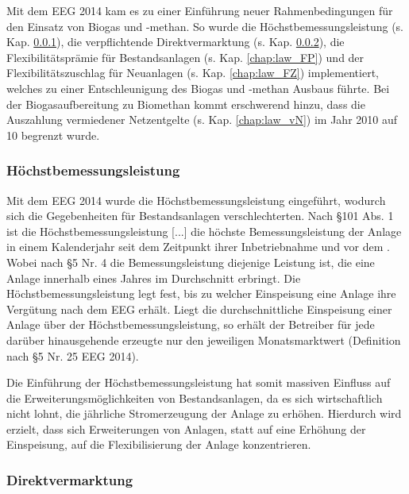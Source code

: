 Mit dem \gls{EEG} \SI{2014}{\relax} kam es zu einer Einführung neuer Rahmenbedingungen für den Einsatz von Biogas und -methan. So wurde die Höchstbemessungsleistung (s. Kap. \ref{chap:law_Bem}), die verpflichtende Direktvermarktung (s. Kap. \ref{chap:law_DV}), die Flexibilitätsprämie für Bestandsanlagen (s. Kap. \ref{chap:law_FP}) und der Flexibilitätszuschlag für Neuanlagen (s. Kap. \ref{chap:law_FZ}) implementiert, welches zu einer Entschleunigung des Biogas und -methan Ausbaus führte. Bei der Biogasaufbereitung zu Biomethan kommt erschwerend hinzu, dass die Auszahlung vermiedener Netzentgelte (s. Kap. \ref{chap:law_vN}) im Jahr \SI{2010}{\relax} auf \SI{10}{\Jahre} begrenzt wurde. \parencite{BDEW2019a}


\subsubsection{Höchstbemessungsleistung}\label{chap:law_Bem}

Mit dem \gls{EEG} \SI{2014}{\relax} wurde die Höchstbemessungsleistung eingeführt, wodurch sich die Gegebenheiten für Bestandsanlagen verschlechterten. Nach \S 101 Abs. 1 ist die \glqq Höchstbemessungsleistung [...] die höchste Bemessungsleistung der Anlage in einem Kalenderjahr seit dem Zeitpunkt ihrer Inbetriebnahme und vor dem .\grqq{} Wobei nach \S 5 Nr. 4 die Bemessungsleistung diejenige Leistung ist, die eine Anlage innerhalb eines Jahres im Durchschnitt erbringt. \parencite{BJV2014a} Die Höchstbemessungsleistung legt fest, bis zu welcher Einspeisung eine Anlage ihre Vergütung nach dem \gls{EEG} erhält. Liegt die durchschnittliche Einspeisung einer Anlage über der Höchstbemessungsleistung, so erhält der Betreiber für jede darüber hinausgehende erzeugte \si{\kwh} nur den jeweiligen Monatsmarktwert (Definition nach \S 5 Nr. 25 \gls{EEG} 2014). \parencite{Loibl2014}\smallskip

Die Einführung der Höchstbemessungsleistung hat somit massiven Einfluss auf die Erweiterungsmöglichkeiten von Bestandsanlagen, da es sich wirtschaftlich nicht lohnt, die jährliche Stromerzeugung der Anlage zu erhöhen. Hierdurch wird erzielt, dass sich Erweiterungen von Anlagen, statt auf eine Erhöhung der Einspeisung, auf die Flexibilisierung der Anlage konzentrieren. \parencite{DanielGromke2019}


\subsubsection{Direktvermarktung}\label{chap:law_DV}

